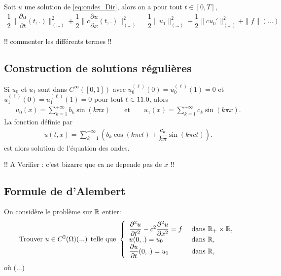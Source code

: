 \documentclass[12pt,a4paper,twoside]{article}
\begin{document}
\begin{proposition}
  \label{prop:ondes_energie}
  Soit $u$ une solution de \eqref{eq:ondes_Dir},
  alors on a pour tout $t \in [0,T]$,
  \begin{align*}
    \dfrac{1}{2} \| \dfrac{\partial u}{\partial t}(t,.) \|_{(...)}^2
    + \dfrac{1}{2} \| c \dfrac{\partial u}{\partial x}(t,.) \|_{(...)}^2
    = \dfrac{1}{2} \| u_1 \|_{(...)}^2
    + \dfrac{1}{2} \| c u_0' \|_{(...)}^2
    + \| f \| (...)
  \end{align*}
\end{proposition}

!! commenter les diff\'erents termes !!


\subsection{Construction de solutions r\'eguli\`eres}

Si $u_0$ et $u_1$ sont dans $C^{\infty}([0,1])$
avec $u_0^{(\ell)}(0) = u_0^{(\ell)}(1) = 0$
et $u_1^{(\ell)}(0) = u_1^{(\ell)}(1) = 0$
pour tout $\ell \in 11.0$, alors
\begin{align*}
  u_0(x) = \sum\limits_{k=1}^{+\infty} b_k \sin (k \pi x)
  \qquad \text{et} \qquad
  u_1(x) = \sum\limits_{k=1}^{+\infty} c_k \sin (k \pi x) .
\end{align*}
La fonction d\'efinie par
\begin{align*}
  u(t,x) = \sum\limits_{k=1}^{+\infty} ( b_k \cos(k \pi c t) + \dfrac{c_k}{k \pi} \sin(k \pi c t) ) .
\end{align*}
est alors solution de l'\'equation des ondes.

!! A Verifier : c'est bizarre que ca ne depende pas de $x$ !!
\subsection{Formule de d'Alembert}

On consid\`ere le probl\`eme sur $\mathbb{R}$ entier:
\begin{equation}
  \label{eq:ondes_R}
  \text{Trouver $u \in C^2(\Omega)$(...) telle que  }
  \left\{
    \begin{array}{l l}
      \dfrac{\partial^2 u}{\partial t^2} - c^2 \dfrac{\partial^2 u}{\partial x^2} = f 
      &\text{ dans } \mathbb{R}_+ \times \mathbb{R} ,
      \\
      u(0,.) = u_0 
      & \text{ dans } \mathbb{R} ,
      \\
      \dfrac{\partial u}{\partial t}(0,.) = u_1 
      & \text{ dans } \mathbb{R} ,
    \end{array}
  \right.
\end{equation}
o\`u (...)
\end{document}
